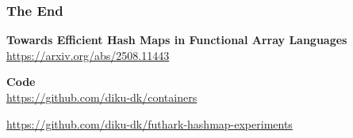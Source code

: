 \documentclass[aspectratio=169]{beamer}
\begin{document}
\begin{frame}\frametitle{The End}
  \begin{center}
    \textbf{Towards Efficient Hash Maps in Functional Array Languages}\\
    \vspace{0.25cm}
    \url{https://arxiv.org/abs/2508.11443}

    \vspace{1cm}
    \textbf{Code} \\
    \vspace{0.25cm}
    \url{https://github.com/diku-dk/containers}

    \vspace{0.25cm}
    \url{https://github.com/diku-dk/futhark-hashmap-experiments}
  \end{center}
\end{frame}
\end{document}

